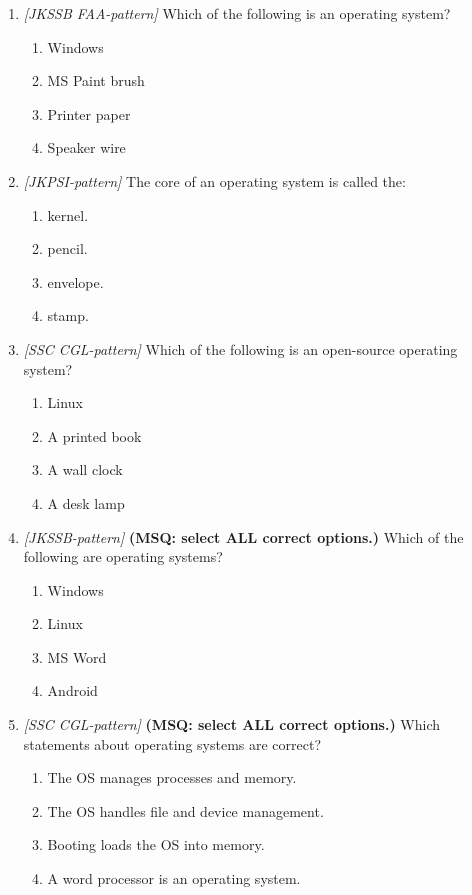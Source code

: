 \documentclass[11pt]{article}
\begin{document}
\begin{enumerate}[label=\textbf{Q\arabic*.}, leftmargin=*]
\item \textit{[JKSSB FAA-pattern]} Which of the following is an operating system?
  \begin{enumerate}[label=\Alph*.]
    \item Windows
    \item MS Paint brush
    \item Printer paper
    \item Speaker wire
  \end{enumerate}
\item \textit{[JKPSI-pattern]} The core of an operating system is called the:
  \begin{enumerate}[label=\Alph*.]
    \item kernel.
    \item pencil.
    \item envelope.
    \item stamp.
  \end{enumerate}
\item \textit{[SSC CGL-pattern]} Which of the following is an open-source operating system?
  \begin{enumerate}[label=\Alph*.]
    \item Linux
    \item A printed book
    \item A wall clock
    \item A desk lamp
  \end{enumerate}
\item \textit{[JKSSB-pattern]} \textbf{(MSQ: select ALL correct options.)} Which of the following are operating systems?
  \begin{enumerate}[label=\Alph*.]
    \item Windows
    \item Linux
    \item MS Word
    \item Android
  \end{enumerate}
\item \textit{[SSC CGL-pattern]} \textbf{(MSQ: select ALL correct options.)} Which statements about operating systems are correct?
  \begin{enumerate}[label=\Alph*.]
    \item The OS manages processes and memory.
    \item The OS handles file and device management.
    \item Booting loads the OS into memory.
    \item A word processor is an operating system.
  \end{enumerate}
\end{enumerate}
\def\JKSSBLessonID{19}\def\JKSSBAnswers{0}
\end{document}
